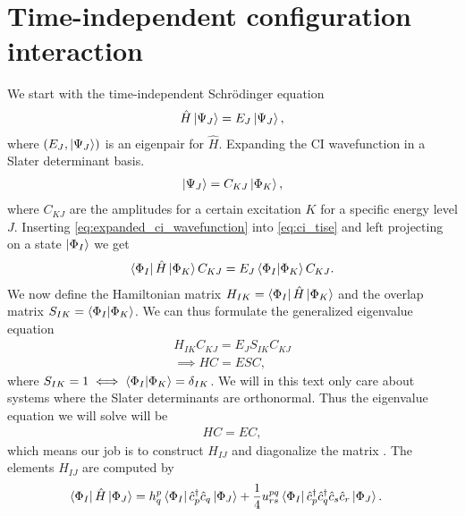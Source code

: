     \section{Time-independent configuration interaction}
        We start with the time-independent Schrödinger equation
        \begin{align}
            \hat{H}\ket{\Psi_J} = E_J\ket{\Psi_J},
            \label{eq:ci_tise}
        \end{align}
        where $(E_J, \ket{\Psi_J})$ is an eigenpair for $\hat{H}$.
        Expanding the CI wavefunction in a Slater determinant basis.
        \begin{align}
            \ket{\Psi_J} = C_{KJ}\ket{\Phi_K},
            \label{eq:expanded_ci_wavefunction}
        \end{align}
        where $C_{KJ}$ are the amplitudes for a certain excitation $K$ for a
        specific energy level $J$.
        Inserting \autoref{eq:expanded_ci_wavefunction} into
        \autoref{eq:ci_tise} and left projecting on a state $\ket{\Phi_I}$ we
        get
        \begin{align}
            \bra{\Phi_I}\hat{H}\ket{\Phi_K}C_{KJ}
            = E_J\braket{\Phi_I}{\Phi_K}C_{KJ}.
        \end{align}
        We now define the Hamiltonian matrix $H_{IK} =
        \bra{\Phi_I}\hat{H}\ket{\Phi_K}$ and the overlap matrix $S_{IK} =
        \braket{\Phi_I}{\Phi_K}$.
        We can thus formulate the generalized eigenvalue equation
        \begin{gather}
            H_{IK}C_{KJ} = E_J S_{IK}C_{KJ}
            \\
            \implies
            HC = ESC,
        \end{gather}
        where $S_{IK} = 1 \iff \braket{\Phi_I}{\Phi_K} = \delta_{IK}$.
        We will in this text only care about systems where the Slater
        determinants are orthonormal.
        Thus the eigenvalue equation we will solve will be
        \begin{align}
            HC = EC,
        \end{align}
        which means our job is to construct $H_{IJ}$ and diagonalize the
        matrix \cite{karwowski}.
        The elements $H_{IJ}$ are computed by
        \begin{align}
            \bra{\Phi_I}\hat{H}\ket{\Phi_J}
            &= h^{p}_{q}
            \bra{\Phi_I}\hat{c}_{p}^{\dagger}\hat{c}_{q}\ket{\Phi_J}
            + \frac{1}{4} u^{pq}_{rs}
            \bra{\Phi_I}\hat{c}_{p}^{\dagger}\hat{c}_{q}^{\dagger}\hat{c}_{s}\hat{c}_{r}\ket{\Phi_J}.
        \end{align}
